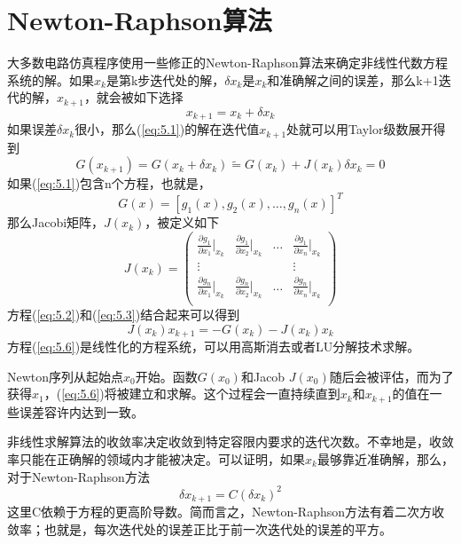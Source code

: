 \section{Newton-Raphson算法}
大多数电路仿真程序使用一些修正的Newton-Raphson算法来确定非线性代数方程系统的解。如果$x_k$是第k步迭代处的解，$\delta x_k$是$x_k$和准确解之间的误差，那么k+1迭代的解，$x_{k+1}$，就会被如下选择
\begin{equation}
    x_{k+1}=x_{k}+\delta x_{k}
    \label{eq:5.2}
\end{equation}
如果误差$\delta x_k$很小，那么(\ref{eq:5.1})的解在迭代值$x_{k+1}$处就可以用Taylor级数展开得到
\begin{equation}
    G(x_{k+1})=G(x_k+\delta x_k) \widetilde{=} G(x_k) + J(x_k)\delta x_k = 0
    \label{eq:5.3}
\end{equation}
如果(\ref{eq:5.1})包含n个方程，也就是，
\begin{equation}
    G(x) = [g_1(x),g_2(x),\dots,g_n(x)]^T
    \label{eq:5.4}
\end{equation}
那么Jacobi矩阵，$J(x_k)$，被定义如下
\begin{equation}
    J(x_k)=\begin{pmatrix}
\frac{\partial g_1}{\partial x_1}|_{x_k} & \frac{\partial g_1}{\partial x_2}|_{x_k} & \dots  &  \frac{\partial g_1}{\partial x_n}|_{x_k}\\
 \vdots &  &  & \vdots  \\
 \frac{\partial g_n}{\partial x_1}|_{x_k}& \frac{\partial g_n}{\partial x_2}|_{x_k} & \dots &  \frac{\partial g_n}{\partial x_n}|_{x_k}\\
\end{pmatrix}
\label{eq:5.5}
\end{equation}
方程(\ref{eq:5.2})和(\ref{eq:5.3})结合起来可以得到
\begin{equation}
    J(x_k)x_{k+1} = -G(x_k) - J(x_k)x_k
    \label{eq:5.6}
\end{equation}
方程(\ref{eq:5.6})是线性化的方程系统，可以用高斯消去或者LU分解技术求解。

Newton序列从起始点$x_0$开始。函数$G(x_0)$和Jacob $J(x_0)$随后会被评估，而为了获得$x_1$，(\ref{eq:5.6})将被建立和求解。这个过程会一直持续直到$x_k$和$x_{k+1}$的值在一些误差容许内达到一致。

非线性求解算法的收敛率决定收敛到特定容限内要求的迭代次数。不幸地是，收敛率只能在正确解的领域内才能被决定。可以证明，如果$x_k$最够靠近准确解，那么，对于Newton-Raphson方法\cite{ref-49}
\begin{equation}
    \delta x_{k+1} = C(\delta x_k)^2
    \label{eq:5.7}
\end{equation}
这里C依赖于方程的更高阶导数。简而言之，Newton-Raphson方法有着二次方收敛率；也就是，每次迭代处的误差正比于前一次迭代处的误差的平方。


